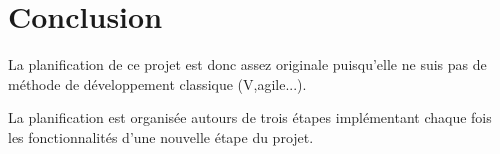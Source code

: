 \chapter*{Conclusion}

La planification de ce projet est donc assez originale puisqu'elle ne suis pas de méthode de développement classique (V,agile...). 

La planification est organisée autours de trois étapes implémentant chaque fois les fonctionnalités d'une nouvelle étape du projet. 
